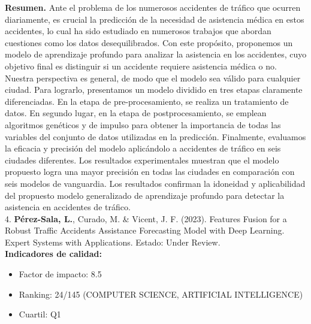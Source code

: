 \documentclass{uathesis-es}
\begin{document}
{\textbf{Resumen.} Ante el problema de los numerosos accidentes de tráfico que ocurren diariamente, es crucial  la predicción de la necesidad de asistencia médica en estos accidentes, lo cual ha sido estudiado en numerosos trabajos que abordan cuestiones como los datos desequilibrados. Con este propósito, proponemos un modelo de aprendizaje profundo para analizar la asistencia en los accidentes, cuyo objetivo final es distinguir si un accidente requiere asistencia médica o no. Nuestra perspectiva es general, de modo que el modelo sea válido para cualquier ciudad. Para lograrlo, presentamos un modelo dividido en tres etapas claramente diferenciadas. En la etapa de pre-procesamiento, se realiza un tratamiento de datos. En segundo lugar, en la etapa de postprocesamiento, se emplean algoritmos genéticos y de impulso para obtener la importancia de todas las variables del conjunto de datos utilizadas en la predicción. Finalmente, evaluamos la eficacia y precisión del modelo aplicándolo a accidentes de tráfico en seis ciudades diferentes. Los resultados experimentales muestran que el modelo propuesto logra una mayor precisión en todas las ciudades en comparación con seis modelos de vanguardia. Los resultados confirman la idoneidad y aplicabilidad del propuesto modelo generalizado de aprendizaje profundo para detectar la asistencia en accidentes de tráfico. \\


4. \textbf{Pérez-Sala, L.}, Curado, M. \& Vicent, J. F. (2023). Features Fusion for a Robust Traffic Accidents Assistance Forecasting Model with Deep Learning. Expert Systems with Applications. Estado: Under Review.\\

\textbf{Indicadores de calidad:} 
\begin{itemize}
    \item Factor de impacto: 8.5
    \item Ranking: 24/145 (COMPUTER SCIENCE, ARTIFICIAL INTELLIGENCE)
    \item Cuartil: Q1
\end{itemize}

}
\end{document}
